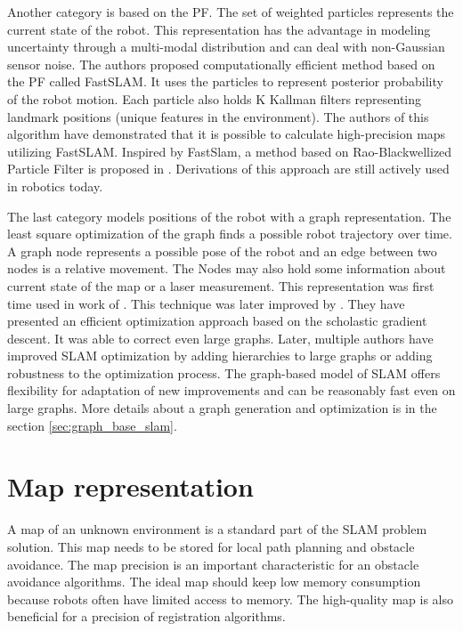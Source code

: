 Another category is based on the \gls{PF}. The set of weighted particles represents the current state of the robot. This representation has the advantage in modeling uncertainty through a multi-modal distribution and can deal with non-Gaussian sensor noise. The authors \cite{FastSlam} proposed computationally efficient method based on the \gls{PF} called FastSLAM. It uses the particles to represent posterior probability of the robot motion. Each particle also holds K Kallman filters representing landmark positions (unique features in the environment). The authors of this algorithm have demonstrated that it is possible to calculate high-precision maps utilizing FastSLAM. Inspired by FastSlam, a method based on Rao-Blackwellized Particle Filter is proposed in \cite{Rao-PF}. Derivations of this approach are still actively used in robotics today.\cite{gmapping} 

The last category models positions of the robot with a graph representation.  The least square optimization of the graph finds a possible robot trajectory over time. A graph node represents a possible pose of the robot and an edge between two nodes is a relative movement. The Nodes may also hold some information about current state of the map or a laser measurement. This representation was first time used in work of \cite{LuMilios}. This technique was later improved by \cite{OlsonGS}. They have presented an efficient optimization approach based on the scholastic gradient descent. It was able to correct even large graphs. Later, multiple authors have improved \gls{SLAM} optimization by adding hierarchies to large graphs or adding robustness to the optimization process. The graph-based model of SLAM offers flexibility for adaptation of new improvements and can be reasonably fast even on large graphs. More details about a graph generation and optimization is in the section \ref{sec:graph_base_slam}.

\section {Map representation}
\label{MAP_REPRE}
A map of an unknown environment is a standard part of the SLAM problem solution. This map needs to be stored for local path planning and obstacle avoidance. The map precision is an important characteristic for an obstacle avoidance algorithms. The ideal map should keep low memory consumption because robots often have limited access to memory.  The high-quality map is also beneficial for a precision of registration algorithms.

